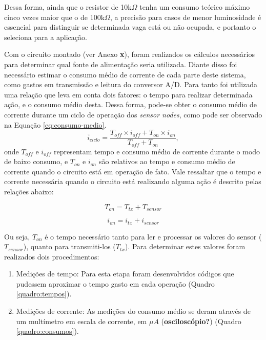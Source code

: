 \documentclass[oneside,openright,12pt]{ufsm_2015} %
\begin{document}
    Dessa forma, ainda que o resistor de 10k$\Omega$ tenha um consumo teórico máximo cinco vezes maior que o de 100k$\Omega$, a precisão para casos de menor luminosidade é essencial para distinguir se determinada vaga está ou não ocupada, e portanto o seleciona para a aplicação.
    
    Com o circuito montado (ver Anexo \textbf{x}), foram realizados os cálculos necessários para determinar qual fonte de alimentação seria utilizada. Diante disso foi necessário estimar o consumo médio de corrente de cada parte deste sistema, como gastos em transmissão e leitura do conversor A/D. Para tanto
    foi utilizada uma relação que leva em conta dois fatores: o tempo para realizar determinada ação, e o consumo médio desta. Dessa forma, pode-se obter o consumo médio de corrente durante um ciclo de operação dos \textit{sensor nodes}, como pode ser observado na Equação \ref{eq:consumo-medio}.
    \begin{equation}\label{eq:consumo-medio}
        \overline{i}_{ciclo} = \frac{T_{off}\times i_{off} + T_{on}\times i_{on}}{T_{off}+T_{on}},
    \end{equation}
    onde $T_{off}$ e $i_{off}$ representam tempo e consumo médio de corrente durante o modo de baixo consumo, e $T_{on}$ e $i_{on}$ são relativos ao tempo e consumo médio de corrente quando o circuito está em operação de fato. Vale ressaltar que o tempo e corrente necessária quando o circuito está realizando alguma ação é descrito pelas relações abaixo:
    
    \begin{equation}
        T_{on} = T_{tx} + T_{sensor}
    \end{equation}
    
    \begin{equation}
        i_{on} = i_{tx} + i_{sensor}
    \end{equation}
    
    Ou seja, $T_{on}$ é o tempo necessário tanto para ler e processar os valores do sensor ($T_{sensor}$), quanto para transmiti-los ($T_{tx}$). Para determinar estes valores foram realizados dois procedimentos:
    
    \begin{enumerate}
        \item Medições de tempo: Para esta etapa foram desenvolvidos códigos que pudessem aproximar o tempo gasto em cada operação (Quadro \ref{quadro:tempos}). 
        
        \item Medições de corrente: As medições do consumo médio se deram através de um multímetro em escala de corrente, em $\mu A$ (\textbf{osciloscópio?}) (Quadro \ref{quadro:consumos}).
    \end{enumerate}
    
\end{document}
